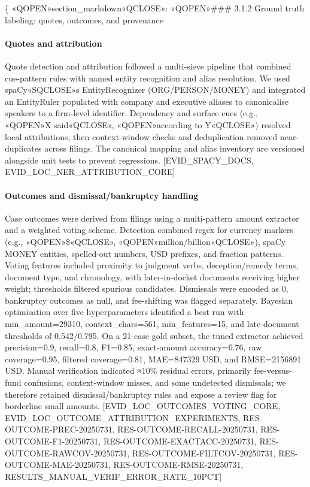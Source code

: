 \{
«QOPEN»section\_markdown«QCLOSE»: «QOPEN»\#\#\# 3.1.2 Ground truth labeling: quotes, outcomes, and provenance

\paragraph{Quotes and attribution}\label{quotes-and-attribution}

Quote detection and attribution followed a multi-sieve pipeline that combined cue-pattern rules with named entity recognition and alias resolution. We used spaCy«SQCLOSE»s EntityRecognizer (ORG/PERSON/MONEY) and integrated an EntityRuler populated with company and executive aliases to canonicalise speakers to a firm-level identifier. Dependency and surface cues (e.g., «QOPEN»X said«QCLOSE», «QOPEN»according to Y«QCLOSE») resolved local attributions, then context-window checks and deduplication removed near-duplicates across filings. The canonical mapping and alias inventory are versioned alongside unit tests to prevent regressions. {[}EVID\_SPACY\_DOCS, EVID\_LOC\_NER\_ATTRIBUTION\_CORE{]}

\paragraph{Outcomes and dismissal/bankruptcy handling}\label{outcomes-and-dismissalbankruptcy-handling}

Case outcomes were derived from filings using a multi-pattern amount extractor and a weighted voting scheme. Detection combined regex for currency markers (e.g., «QOPEN»\$«QCLOSE», «QOPEN»million/billion«QCLOSE»), spaCy MONEY entities, spelled-out numbers, USD prefixes, and fraction patterns. Voting features included proximity to judgment verbs, deception/remedy terms, document type, and chronology, with later-in-docket documents receiving higher weight; thresholds filtered spurious candidates. Dismissals were encoded as 0, bankruptcy outcomes as null, and fee-shifting was flagged separately. Bayesian optimisation over five hyperparameters identified a best run with min\_amount=29310, context\_chars=561, min\_features=15, and late-document thresholds of 0.542/0.795. On a 21-case gold subset, the tuned extractor achieved precision=0.9, recall=0.8, F1=0.85, exact-amount accuracy=0.76, raw coverage=0.95, filtered coverage=0.81, MAE=847329 USD, and RMSE=2156891 USD. Manual verification indicated ≈10\% residual errors, primarily fee-versus-fund confusions, context-window misses, and some undetected dismissals; we therefore retained dismissal/bankruptcy rules and expose a review flag for borderline small amounts. {[}EVID\_LOC\_OUTCOMES\_VOTING\_CORE, EVID\_LOC\_OUTCOME\_ATTRIBUTION\_EXPERIMENTS, RES-OUTCOME-PREC-20250731, RES-OUTCOME-RECALL-20250731, RES-OUTCOME-F1-20250731, RES-OUTCOME-EXACTACC-20250731, RES-OUTCOME-RAWCOV-20250731, RES-OUTCOME-FILTCOV-20250731, RES-OUTCOME-MAE-20250731, RES-OUTCOME-RMSE-20250731, RESULTS\_MANUAL\_VERIF\_ERROR\_RATE\_10PCT{]}

